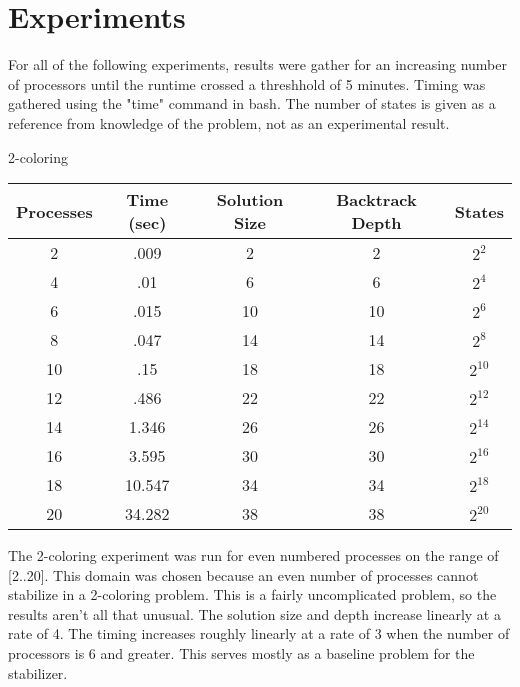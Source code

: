 \section{Experiments}
For all of the following experiments, results were gather for an increasing number of processors until the runtime crossed a threshhold of 5 minutes.
Timing was gathered using the "time" command in bash.  The number of states is given as a reference from knowledge of the problem, not as an
experimental result.
\begin{center}
2-coloring \\
\begin{tabular}{|c|c|c|c|c|}
\hline
 Processes & Time (sec) & Solution Size & Backtrack Depth & States \\
\hline
 2 & .009 & 2 & 2 & $2^{2}$             \\
 4 & .01 & 6 & 6 & $2^{4}$              \\
 6 & .015 & 10 & 10 & $2^{6}$           \\
 8 & .047 & 14 & 14 & $2^{8}$           \\
 10 & .15 & 18 & 18 & $2^{10}$          \\
 12 & .486 & 22 & 22 & $2^{12}$         \\
 14 & 1.346 & 26 & 26 & $2^{14}$        \\
 16 & 3.595 & 30 & 30 & $2^{16}$        \\
 18 & 10.547 & 34 & 34 & $2^{18}$       \\
 20 & 34.282 & 38 & 38 & $2^{20}$       \\
\hline
\end{tabular}
\end{center}

The 2-coloring experiment was run for even numbered processes on the range of [2..20].  This domain was chosen because an even number of processes
cannot stabilize in a 2-coloring problem.  This is a fairly uncomplicated problem, so the results aren't all that unusual.  The solution size and depth
increase linearly at a rate of 4.  The timing increases roughly linearly at a rate of 3 when the number of processors is 6 and greater.  This serves
mostly as a baseline problem for the stabilizer.

